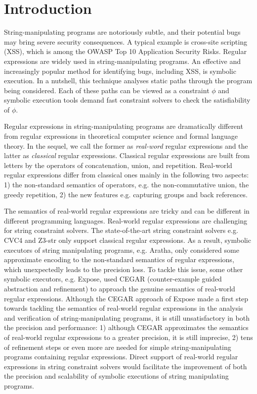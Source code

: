
\section{Introduction}



%

String-manipulating programs are notoriously subtle, and their potential bugs may bring severe security consequences. A typical example is cross-site scripting (XSS), which is among the OWASP Top 10 Application Security Risks. Regular expressions are widely used in string-manipulating programs. An effective and increasingly popular method for identifying bugs, including XSS, is symbolic execution. In a nutshell, this technique analyses static paths through the program being considered. Each of these paths can be viewed as a constraint $\phi$ and symbolic execution tools demand fast constraint solvers to check the satisfiability of $\phi$. 

Regular expressions in string-manipulating programs are dramatically different from regular expressions in theoretical computer science and formal language theory. In the sequel, we call the former as \emph{real-word} regular expressions and the latter as \emph{classical} regular expressions. Classical regular expressions are built from letters by the operators of concatenation, union, and repetition. Real-world regular expressions differ from classical ones mainly in the following two aspects: 1) the non-standard semantics of operators, e.g. the non-commutative union, the greedy repetition, 2) the new features e.g. capturing groups and back references. 

The semantics of real-world regular expressions are tricky and can be different in different programming languages. Real-world regular expressions are challenging for string constraint solvers. The state-of-the-art string constraint solvers e.g. CVC4 and Z3-str only support classical regular expressions. As a result, symbolic executors of string manipulating programs, e.g. Aratha, only considered some approximate encoding to the non-standard semantics of regular expressions, which unexpectedly leads to the precision loss. To tackle this issue, some other symbolic executors, e.g. Expose, used CEGAR (counter-example guided abstraction and refinement) to approach the genuine semantics of real-world regular expressions. Although the CEGAR approach of Expose made a first step towards tackling the semantics of real-world regular expressions in the analysis and verification of string-manipulating programs, it is still unsatisfactory in both the precision and performance: 1) although CEGAR approximates the semantics of real-world regular expressions to a greater precision, it is still imprecise, 2) tens of refinement steps or even more are needed for simple string-manipulating programs containing regular expressions. Direct support of real-world regular expressions in string constraint solvers would facilitate the improvement of both the precision and scalability of symbolic executions of string manipulating programs.

